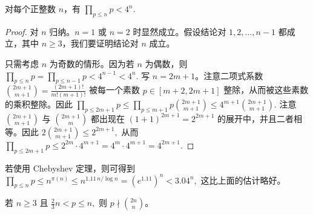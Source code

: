 
\begin{lemma}[原文 Lemma 3.14]
	对每个正整数 $n$，有
	\(\textstyle \prod_{p\leq\allowbreak{} n}p<4^n.\)
\end{lemma}

\begin{proof}
	对 $n$ 归纳。$n=1$ 或 $n=2$ 时显然成立。假设结论对 $1,2,\ldots,n-1$ 都成立，其中 $n\geq 3$，我们要证明结论对 $n$ 成立。

	只需考虑 $n$ 为奇数的情形。因为若 $n$ 为偶数，则
	\(\textstyle \prod_{p\leq\allowbreak{} n}p =\allowbreak{} \prod_{p\leq\allowbreak{} n-1}p < 4^{n-1}<4^n.\)
	写 $n=2m+1$。注意二项式系数
	\(\textstyle \binom{2m+\allowbreak{}1}{m+\allowbreak{}1} =\allowbreak{} \frac{(2m+\allowbreak{}1)!}{m!(m+\allowbreak{}1)!}\)
	被每一个素数 $p\in[m+2,2m+1]$ 整除，从而被这些素数的乘积整除。因此
	\(\textstyle \prod_{p\leq\allowbreak{} 2m+\allowbreak{}1}p \leq\allowbreak{} \prod_{p\leq\allowbreak{} m+\allowbreak{}1}p\binom{2m+\allowbreak{}1}{m+\allowbreak{}1} \leq\allowbreak{} 4^{m+\allowbreak{}1}\binom{2m+\allowbreak{}1}{m+\allowbreak{}1}.\)
	注意 $\binom{2m+1}{m+1}$ 与 $\binom{2m+1}{m}$ 都出现在
	\(\textstyle (1+\allowbreak{}1)^{2m+\allowbreak{}1}=\allowbreak{}2^{2m+\allowbreak{}1}\)
	的展开中，并且二者相等。因此
	\(\textstyle 2\binom{2m+\allowbreak{}1}{m+\allowbreak{}1}\leq\allowbreak{} 2^{2m+\allowbreak{}1},\allowbreak{}\)
	从而
	\(\textstyle \prod_{p\leq\allowbreak{} 2m+\allowbreak{}1}p \leq\allowbreak{} 2^{2m}\cdot 4^{m+\allowbreak{}1} =\allowbreak{} 4^m\cdot 4^{m+\allowbreak{}1} =\allowbreak{} 4^{2m+\allowbreak{}1}.\)
\end{proof}

\begin{remark}
	若使用 Chebyshev 定理，则可得到
	\(\textstyle \prod_{p\leq\allowbreak{} n}p \leq\allowbreak{} n^{\pi(n)} \leq\allowbreak{} n^{1.11\, n/\log n} =\allowbreak{} (e^{1.11})^n < 3.04^n,\allowbreak{}\)
	这比上面的估计略好。
\end{remark}

\begin{lemma}[原文 Lemma 3.15]
	若 $n\geq 3$ 且
	\(\textstyle \frac23 n<p\leq\allowbreak{} n,\allowbreak{}\)
	则 $p\nmid \binom{2n}{n}$。
\end{lemma}

